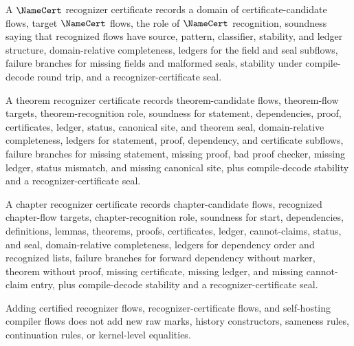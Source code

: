 \begin{example}
\label{ex:recognizer-generated-namecert-cert}
A $\NameCert$ recognizer certificate records a domain of certificate-candidate flows, target $\NameCert$ flows, the role of $\NameCert$ recognition, soundness saying that recognized flows have source, pattern, classifier, stability, and ledger structure, domain-relative completeness, ledgers for the field and seal subflows, failure branches for missing fields and malformed seals, stability under compile-decode round trip, and a recognizer-certificate seal.
\end{example}

\begin{example}
\label{ex:recognizer-generated-theorem-cert}
A theorem recognizer certificate records theorem-candidate flows, theorem-flow targets, theorem-recognition role, soundness for statement, dependencies, proof, certificates, ledger, status, canonical site, and theorem seal, domain-relative completeness, ledgers for statement, proof, dependency, and certificate subflows, failure branches for missing statement, missing proof, bad proof checker, missing ledger, status mismatch, and missing canonical site, plus compile-decode stability and a recognizer-certificate seal.
\end{example}

\begin{example}
\label{ex:recognizer-generated-chapter-cert}
A chapter recognizer certificate records chapter-candidate flows, recognized chapter-flow targets, chapter-recognition role, soundness for start, dependencies, definitions, lemmas, theorems, proofs, certificates, ledger, cannot-claims, status, and seal, domain-relative completeness, ledgers for dependency order and recognized lists, failure branches for forward dependency without marker, theorem without proof, missing certificate, missing ledger, and missing cannot-claim entry, plus compile-decode stability and a recognizer-certificate seal.
\end{example}

\begin{theorem}
\label{thm:recognizer-generated-conservative-over-kernel}
Adding certified recognizer flows, recognizer-certificate flows, and self-hosting compiler flows does not add new raw marks, history constructors, sameness rules, continuation rules, or kernel-level equalities.
\end{theorem}

